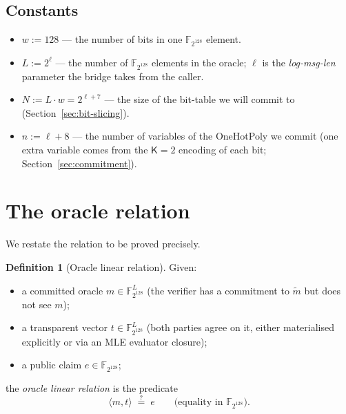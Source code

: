 \documentclass[11pt,a4paper]{article}
\theoremstyle{definition}
\newtheorem{definition}[theorem]{Definition}
\theoremstyle{remark}
\newcommand{\binF}{\mathbb{F}_{2^{128}}}        %
\newcommand{\MLE}[1]{\widetilde{#1}}              %
\newcommand{\Transparent}{t}                      %
\newcommand{\Message}{m}                          %
\begin{document}
\subsection*{Constants}

\begin{itemize}[leftmargin=*, itemsep=2pt]
  \item $w := 128$ — the number of bits in one $\binF$ element.
  \item $L := 2^{\ell}$ — the number of $\binF$ elements in the oracle;
        $\ell$ is the \emph{log-msg-len} parameter the bridge takes from
        the caller.
  \item $N := L \cdot w = 2^{\ell + 7}$ — the size of the bit-table
        we will commit to (Section~\ref{sec:bit-slicing}).
  \item $n := \ell + 8$ — the number of variables of the OneHotPoly we
        commit (one extra variable comes from the $\mathsf{K}=2$ encoding
        of each bit; Section~\ref{sec:commitment}).
\end{itemize}


\section{The oracle relation}
\label{sec:oracle-relation}

We restate the relation to be proved precisely.

\begin{definition}[Oracle linear relation]
\label{def:oracle-relation}
Given:
\begin{itemize}[leftmargin=*, itemsep=2pt]
  \item a committed oracle $\Message \in \binF^L$ (the verifier has a
        commitment to $\MLE{\Message}$ but does not see $\Message$);
  \item a transparent vector $\Transparent \in \binF^L$ (both parties
        agree on it, either materialised explicitly or via an MLE
        evaluator closure);
  \item a public claim $e \in \binF$;
\end{itemize}
the \emph{oracle linear relation} is the predicate
\[
  \langle \Message, \Transparent \rangle \;\stackrel{?}{=}\; e
  \qquad \text{(equality in } \binF \text{)}.
\]
\end{definition}
\end{document}
